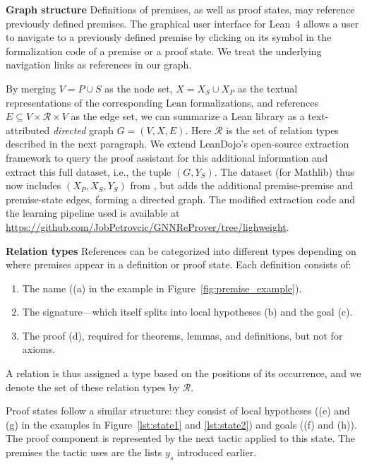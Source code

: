 \textbf{Graph structure} Definitions of premises, as well as proof states, may reference previously defined premises. The graphical user interface for Lean~4 allows a user to navigate to a previously defined premise by clicking on its symbol in the formalization code of a premise or a proof state. We treat the underlying navigation links as references in our graph.

By merging $V = P \cup S$ as the node set, $X = X_S \cup X_P$ as the textual representations of the corresponding Lean formalizations, and references $E \subseteq V \times \mathcal{R} \times V$ as the edge set, we can summarize a Lean library as a text-attributed \emph{directed} graph $G = (V, X, E)$. Here $\mathcal{R}$ is the set of relation types described in the next paragraph. We extend LeanDojo’s open-source extraction framework \citep{yang2023leandojo} to query the proof assistant for this additional information and extract this full dataset, i.e., the tuple $(G, Y_S)$. The dataset (for Mathlib) thus now includes $(X_P, X_S, Y_S)$ from \citep{yang2023leandojo}, but adds the additional premise-premise and premise-state edges, forming a directed graph. The modified extraction code and the learning pipeline used is available at \url{https://github.com/JobPetrovcic/GNNReProver/tree/lighweight}.

\textbf{Relation types}  
References can be categorized into different types depending on where premises appear in a definition or proof state. Each definition consists of: 
\begin{enumerate}
    \item The name (\textup{(a)} in the example in Figure~\ref{fig:premise_example}).
    \item The signature---which itself splits into local hypotheses \textup{(b)} and the goal \textup{(c)}. 
    \item \label{par:relations:proofs} The proof (\textup{d}), required for theorems, lemmas, and definitions, but not for axioms.
\end{enumerate}
A relation is thus assigned a type based on the positions of its occurrence, and we denote the set of these relation types by $\mathcal{R}$.

Proof states follow a similar structure: they consist of local hypotheses (\textup{(e)} and \textup{(g)} in the examples in Figure~\ref{lst:state1} and \ref{lst:state2}) and goals (\textup{(f)} and \textup{(h)}). The proof component is represented by the next tactic applied to this state. The premises the tactic uses are the lists $y_s$ introduced earlier.

